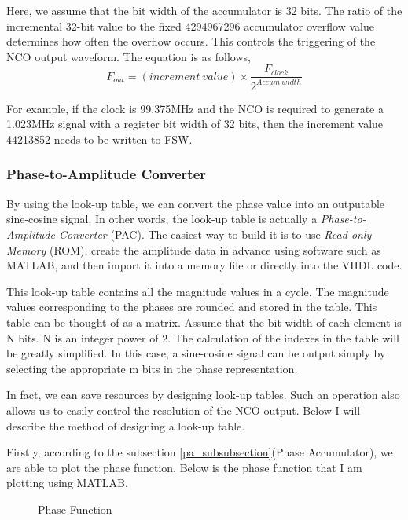 Here, we assume that the bit width of the accumulator is 32 bits. The ratio of the incremental 32-bit value to the fixed \num{4294967296} accumulator overflow value determines how often the overflow occurs. This controls the triggering of the NCO output waveform. The equation is as follows,
\begin{equation}
    F_{out} = (increment\ value) \times \frac{F_{clock}}{2^{Accum\ width}}
    \label{equ:nco}
\end{equation}

For example, if the clock is 99.375MHz and the NCO is required to generate a 1.023MHz signal with a register bit width of 32 bits, then the increment value \num{44213852} needs to be written to FSW.

\subsubsection{Phase-to-Amplitude Converter}
By using the look-up table, we can convert the phase value into an outputable sine-cosine signal. In other words, the look-up table is actually a \textit{Phase-to-Amplitude Converter} (PAC). The easiest way to build it is to use \textit{Read-only Memory} (ROM)\cite{RN190}, create the amplitude data in advance using software such as MATLAB, and then import it into a memory file or directly into the VHDL code.

This look-up table contains all the magnitude values in a cycle. The magnitude values corresponding to the phases are rounded and stored in the table. This table can be thought of as a matrix. Assume that the bit width of each element is N bits. N is an integer power of 2. The calculation of the indexes in the table will be greatly simplified\cite{RN194}. In this case, a sine-cosine signal can be output simply by selecting the appropriate m bits in the phase representation.

In fact, we can save resources by  designing look-up tables\cite{RN193}. Such an operation also allows us to easily control the resolution of the NCO output. Below I will describe the method of designing a look-up table.

Firstly, according to the subsection \ref{pa_subsubsection}(Phase Accumulator), we are able to plot the phase function. Below is the phase function that I am plotting using MATLAB.

\begin{figure}[!htbp]
    \centering
    
    \caption{Phase Function}
    \label{fig:phase_function}
\end{figure}

